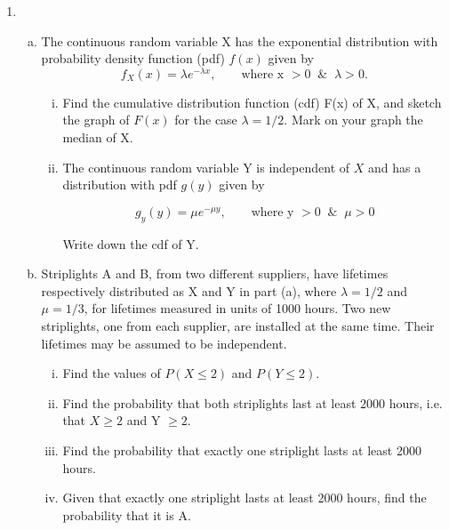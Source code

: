 \documentclass[a4paper,12pt]{article}
\begin{document}
\begin{enumerate}
\begin{enumerate}[(a)]
\end{enumerate}

\item
\begin{enumerate}[(a)] 
\item The continuous random variable X has the exponential distribution with
probability density function (pdf) $f(x)$ given by
$$ f_{X}(x) = \lambda e^{-\lambda x}, \qquad \mbox{where x } >0 \;\; \& \;\; \lambda >0. $$
\begin{enumerate}[(i)]
\item Find the cumulative distribution function (cdf) F(x) of X, and sketch the
graph of $F(x)$ for the case $\lambda = 1/2$. Mark on your graph the median of X.

\item  The continuous random variable Y is independent of $X$ and has a
distribution with pdf $g(y)$ given by

$$ g_{y}(y) = \mu e^{-\mu y}, \qquad \mbox{where y } >0 \;\; \& \;\; \mu >0 $$

Write down the cdf of Y.
\end{enumerate}
\item Striplights A and B, from two different suppliers, have lifetimes respectively
distributed as X and Y in part (a), where $\lambda = 1/2$ and $\mu = 1/3$, for lifetimes
measured in units of 1000 hours. Two new striplights, one from each supplier,
are installed at the same time. Their lifetimes may be assumed to be
independent.
\begin{enumerate}[(i)]
\item Find the values of $P(X \leq 2)$ and $P(Y \leq 2)$.
\item Find the probability that both striplights last at least 2000 hours, i.e. that
$X \geq 2$ and Y $\geq 2$.
\item Find the probability that exactly one striplight lasts at least 2000 hours.
\item Given that exactly one striplight lasts at least 2000 hours, find the
probability that it is A.
\end{enumerate}
\end{enumerate}

\end{enumerate}
\end{document}
